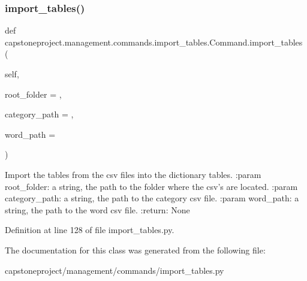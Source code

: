 \subsubsection{\texorpdfstring{import\+\_\+tables()}{import\_tables()}}
{\footnotesize\ttfamily def capstoneproject.\+management.\+commands.\+import\+\_\+tables.\+Command.\+import\+\_\+tables (\begin{DoxyParamCaption}\item[{}]{self,  }\item[{}]{root\+\_\+folder = {\ttfamily \textquotesingle{}\textquotesingle{}},  }\item[{}]{category\+\_\+path = {\ttfamily \textquotesingle{}\textquotesingle{}},  }\item[{}]{word\+\_\+path = {\ttfamily \textquotesingle{}\textquotesingle{}} }\end{DoxyParamCaption})}

\begin{DoxyVerb}Import the tables from the csv files into the dictionary tables.
:param root_folder: a string, the path to the folder
where the csv's are located.
:param category_path: a string, the path to the category csv file.
:param word_path: a string, the path to the word csv file.
:return: None
\end{DoxyVerb}
 

Definition at line 128 of file import\+\_\+tables.\+py.



The documentation for this class was generated from the following file\+:\begin{DoxyCompactItemize}
\item 
capstoneproject/management/commands/import\+\_\+tables.\+py\end{DoxyCompactItemize}
